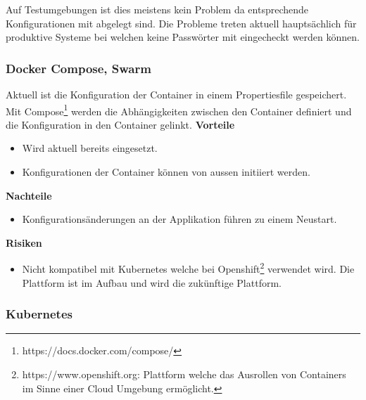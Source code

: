Auf Testumgebungen ist dies meistens kein Problem da entsprechende Konfigurationen mit abgelegt sind. Die Probleme treten aktuell hauptsächlich für produktive Systeme bei welchen keine Passwörter mit eingecheckt werden können.

\subsubsection{Docker Compose, Swarm}

Aktuell ist die Konfiguration der Container in einem Propertiesfile gespeichert. Mit Compose\footnote{https://docs.docker.com/compose/} werden die Abhängigkeiten zwischen den Container definiert und die Konfiguration in den Container gelinkt.\newline
\newline
\textbf{Vorteile}
\begin{itemize}
	\item Wird aktuell bereits eingesetzt.
	\item Konfigurationen der Container können von aussen initiiert werden.
\end{itemize}
\textbf{Nachteile}
\begin{itemize}
	\item Konfigurationsänderungen an der Applikation führen zu einem Neustart.
\end{itemize}
\textbf{Risiken}
\begin{itemize}
	\item Nicht kompatibel mit Kubernetes welche bei Openshift\footnote{https://www.openshift.org: Plattform welche das Ausrollen von Containers im Sinne einer Cloud Umgebung ermöglicht.}  verwendet wird. Die Plattform ist im Aufbau und wird die zukünftige Plattform.
\end{itemize}

\subsubsection{Kubernetes}

